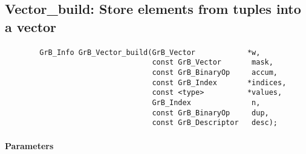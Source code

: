 \subsection{{\sf Vector\_build}: Store elements from tuples into a vector}
\label{Sec:Vector_build}

\paragraph{\syntax}

\begin{verbatim}
        GrB_Info GrB_Vector_build(GrB_Vector            *w,
                                  const GrB_Vector       mask,
                                  const GrB_BinaryOp     accum,
                                  const GrB_Index       *indices,
                                  const <type>          *values,
                                  GrB_Index              n,
                                  const GrB_BinaryOp     dup,
                                  const GrB_Descriptor   desc);
\end{verbatim}

\paragraph{Parameters}

